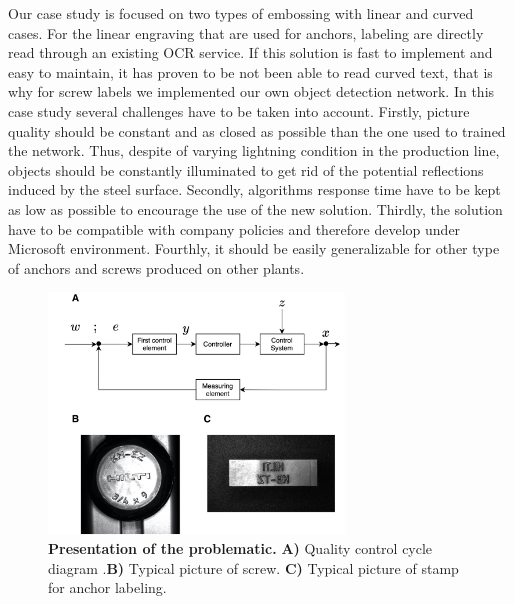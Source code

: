 \documentclass[12pt, french, a4paper]{article} %
\begin{document}
Our case study is focused on two types of embossing with linear and curved cases. For the linear engraving that are used for anchors, labeling are directly read through an existing \gls{OCR} service. If this solution is fast to implement and easy to maintain, it has proven to be not been able to read curved text, that is why for screw labels we implemented our own object detection network. In this case study several challenges have to be taken into account. Firstly, picture quality should be constant and as closed as possible than the one used to trained the network. Thus, despite of varying lightning condition in the production line, objects should be constantly illuminated to get rid of the potential reflections induced by the steel surface. Secondly, algorithms response time have to be kept as low as possible to encourage the use of the new solution. Thirdly, the solution have to be compatible with company policies and therefore develop under Microsoft environment. Fourthly, it should be easily generalizable for other type of anchors and screws produced on other plants.

 \begin{figure}[H]
 \centering
 \includegraphics[width=0.7\textwidth]{figure/quality_cycle_main.jpg}
 \caption{\textbf{Presentation of the problematic.} \textbf{A)} Quality control cycle diagram \cite{linss2018qualitatsmanagement}.\textbf{B)} Typical picture of screw. \textbf{C)} Typical picture of stamp for anchor labeling. }
 \label{quality_cylce_main}
\end{figure} 
\end{document}
